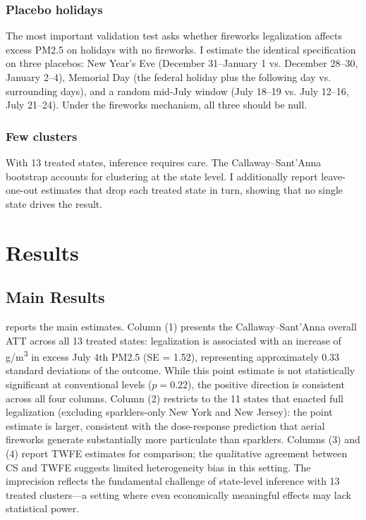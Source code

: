 \documentclass[12pt]{article}
\begin{document}
\subsubsection*{Placebo holidays} The most important validation test asks whether fireworks legalization affects excess PM2.5 on holidays with no fireworks. I estimate the identical specification on three placebos: New Year's Eve (December 31--January 1 vs. December 28--30, January 2--4), Memorial Day (the federal holiday plus the following day vs. surrounding days), and a random mid-July window (July 18--19 vs. July 12--16, July 21--24). Under the fireworks mechanism, all three should be null.

\subsubsection*{Few clusters} With 13 treated states, inference requires care. The Callaway--Sant'Anna bootstrap accounts for clustering at the state level. I additionally report leave-one-out estimates that drop each treated state in turn, showing that no single state drives the result.


\section{Results}

\subsection{Main Results}



 reports the main estimates. Column (1) presents the Callaway--Sant'Anna overall ATT across all 13 treated states: legalization is associated with an increase of \hspace{0pt}\textmu g/m\textsuperscript{3} in excess July 4th PM2.5 (SE = 1.52), representing approximately 0.33 standard deviations of the outcome. While this point estimate is not statistically significant at conventional levels ($p = 0.22$), the positive direction is consistent across all four columns. Column (2) restricts to the 11 states that enacted full legalization (excluding sparklers-only New York and New Jersey): the point estimate is larger, consistent with the dose-response prediction that aerial fireworks generate substantially more particulate than sparklers. Columns (3) and (4) report TWFE estimates for comparison; the qualitative agreement between CS and TWFE suggests limited heterogeneity bias in this setting. The imprecision reflects the fundamental challenge of state-level inference with 13 treated clusters---a setting where even economically meaningful effects may lack statistical power.
\end{document}
